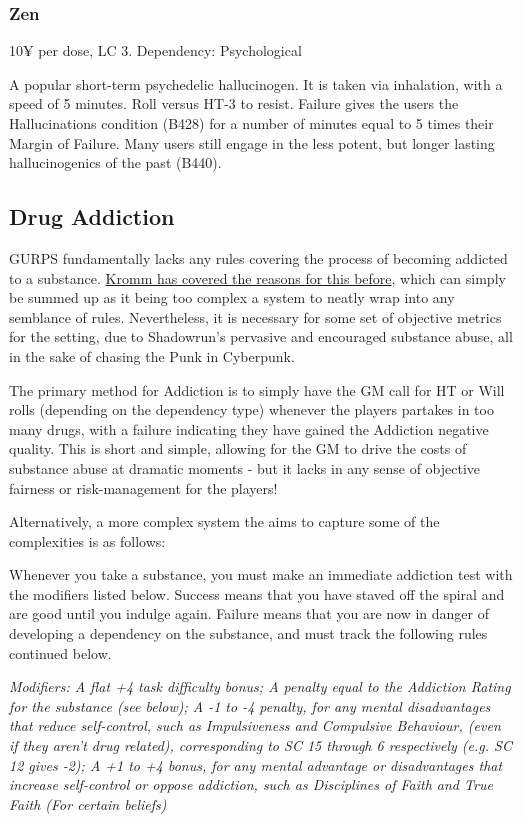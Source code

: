 \subsubsection{Zen}
\begin{flushleft}
	10¥ per dose, LC 3.
	Dependency: Psychological
\end{flushleft}

A popular short-term psychedelic hallucinogen. It is taken via inhalation, with a speed of 5 minutes. Roll versus HT-3 to resist. Failure gives the users the Hallucinations condition (B428) for a number of minutes equal to 5 times their Margin of Failure. Many users still engage in the less potent, but longer lasting hallucinogenics of the past (B440).

\subsection{Drug Addiction}

GURPS fundamentally lacks any rules covering the process of becoming addicted to a substance. \textcolor{blue}{\href{http://forums.sjgames.com/showpost.php?p=186043&postcount=3}{Kromm has covered the reasons for this before}}, which can simply be summed up as it being too complex a system to neatly wrap into any semblance of rules. Nevertheless, it is necessary for some set of objective metrics for the setting, due to Shadowrun's pervasive and encouraged substance abuse, all in the sake of chasing the Punk in Cyberpunk.

The primary method for Addiction is to simply have the GM call for HT or Will rolls (depending on the dependency type) whenever the players partakes in too many drugs, with a failure indicating they have gained the Addiction negative quality. This is short and simple, allowing for the GM to drive the costs of substance abuse at dramatic moments - but it lacks in any sense of objective fairness or risk-management for the players!

Alternatively, a more complex system the aims to capture some of the complexities is as follows:

Whenever you take a substance, you must make an immediate addiction test with the modifiers listed below. Success means that you have staved off the spiral and are good until you indulge again. Failure means that you are now in danger of developing a dependency on the substance, and must track the following rules continued below.

\textcolor{NavyBlue}{\textit{Modifiers: A flat +4 task difficulty bonus; A penalty equal to the Addiction Rating for the substance (see below); A -1 to -4 penalty, for any mental disadvantages that reduce self-control, such as Impulsiveness and Compulsive Behaviour, (even if they aren't drug related), corresponding to SC 15 through 6 respectively (e.g. SC 12 gives -2); A +1 to +4 bonus, for any mental advantage or disadvantages that increase self-control or oppose addiction, such as Disciplines of Faith and True Faith (For certain beliefs)}}

